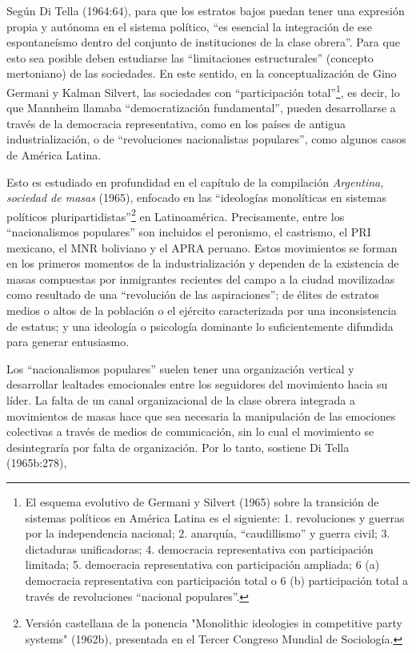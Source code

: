 Según Di Tella (1964:64), para que los estratos bajos puedan tener una expresión propia y autónoma en el sistema político, \enquote{es esencial la integración de ese espontaneísmo dentro del conjunto de instituciones de la clase obrera}. Para que esto sea posible deben estudiarse las \enquote{limitaciones estructurales} (concepto mertoniano) de las sociedades. En este sentido, en la conceptualización de Gino Germani y Kalman Silvert, las sociedades con \enquote{participación total}\footnote{El esquema evolutivo de Germani y Silvert (1965) sobre la transición de sistemas políticos en América Latina es el siguiente: 1. revoluciones y guerras por la independencia nacional; 2. anarquía, \enquote{caudillismo} y guerra civil; 3. dictaduras unificadoras; 4. democracia representativa con participación limitada; 5. democracia representativa con participación ampliada; 6 (a) democracia representativa con participación total o 6 (b) participación total a través de revoluciones \enquote{nacional populares}.}, es decir, lo que Mannheim llamaba \enquote{democratización fundamental}, pueden desarrollarse a través de la democracia representativa, como en los países de antigua industrialización, o de \enquote{revoluciones nacionalistas populares}, como algunos casos de América Latina.

Esto es estudiado en profundidad en el capítulo de la compilación \emph{Argentina, sociedad de masas} (1965), enfocado en las \enquote{ideologías monolíticas en sistemas políticos pluripartidistas}\footnote{Versión castellana de la ponencia "Monolithic ideologies in competitive party systems" (1962b), presentada en el Tercer Congreso Mundial de Sociología.} en Latinoamérica. Precisamente, entre los \enquote{nacionalismos populares} son incluidos el peronismo, el castrismo, el PRI mexicano, el MNR boliviano y el APRA peruano. Estos movimientos se forman en los primeros momentos de la industrialización y dependen de la existencia de masas compuestas por inmigrantes recientes del campo a la ciudad movilizadas como resultado de una \enquote{revolución de las aspiraciones}; de élites de estratos medios o altos de la población o el ejército caracterizada por una inconsistencia de estatus; y una ideología o psicología dominante lo suficientemente difundida para generar entusiasmo.

Los \enquote{nacionalismos populares} suelen tener una organización vertical y desarrollar lealtades emocionales entre los seguidores del movimiento hacia su líder. La falta de un canal organizacional de la clase obrera integrada a movimientos de masas hace que sea necesaria la manipulación de las emociones colectivas a través de medios de comunicación, sin lo cual el movimiento se desintegraría por falta de organización. Por lo tanto, sostiene Di Tella (1965b:278),

